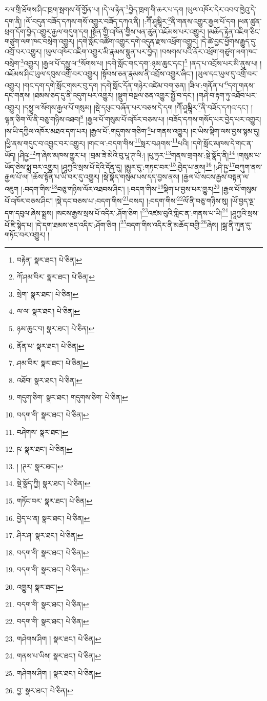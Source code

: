རལ་གྲི་ཐོགས་ཤིང་ཁྲག་སྦགས་གོ་གྱོན་པ། །དེ་ལ་རྟེན་\footnote{བརྟེན་  སྣར་ཐང་།  པེ་ཅིན། }བྱེད་ཁྲག་གི་ཆར་པ་དག །ཡུལ་འཁོར་དེར་འབབ་ཁྱེའུ་དེ་དག་ནི། །ལོ་བདུན་བཟོད་དཀས་གསོ་འགྱུར་བཟོད་དཀའ་ནི། །:ཀཽ་ཤཱམྦཱིར་\footnote{ཀོ་ཤམ་བིར་  སྣར་ཐང་།  པེ་ཅིན། }ནི་གནས་འགྱུར་རྒྱལ་པོ་དག །ཕན་ཚུན་ཕྲག་དོག་བྱེད་འགྱུར་རྒྱལ་གདུག་དག །སྔོན་གྱི་འཁོན་གྱིས་ཕན་ཚུན་འཇོམས་པར་འགྱུར། །མཆོད་རྟེན་འཇིག་ཅིང་གཙུག་ལག་ཁང་བསྲེག་འགྱུར། །དགེ་སློང་འཚོག་འགྱུར་དགེ་འདུན་རྫས་འཕྲོག་འགྱུར། །དེ་ཚེ་བྱང་ཕྱོགས་རྒྱུད་དུ་འགྲོ་བར་འགྱུར། །ཡུལ་འཁོར་འཇིག་འགྱུར་མི་རྣམས་སྣུན་པར་བྱེད། །བསགས་པའི་ནོར་འཕྲོག་གཙུག་ལག་ཁང་བསྲེག་\footnote{སྲེག་  སྣར་ཐང་།  པེ་ཅིན། }འགྱུར། །རྒྱལ་པོ་དསྱུ་ལ་\footnote{ལ་ལ་  སྣར་ཐང་།  པེ་ཅིན། }སོགས་པ། །དགེ་སློང་གང་དག་:ཉམ་ཆུང་དང་།\footnote{ཉམ་ཆུང་བ།  སྣར་ཐང་།  པེ་ཅིན། } །ནད་པ་འབྲོས་པར་མི་ནུས་པ། །འཇོམས་ཤིང་ཡུལ་དབུས་འགྲོ་བར་འགྱུར། །སྟོབས་ཅན་རྣམས་ནི་འབྲོས་འགྱུར་ཞིང་། །ཡུལ་དང་ཡུལ་དུ་འགྲོ་བར་འགྱུར། །གང་དག་དགེ་སློང་གསར་བུ་དག །དགེ་སློང་དོན་གཉེར་འཛེམ་བག་ཅན། །ཟིལ་:གནོན་པ་\footnote{ནོན་པ་  སྣར་ཐང་།  པེ་ཅིན། }དག་གནས་དང་གནས། །ཐམས་ཅད་དུ་ནི་འདུག་པར་འགྱུར། །སྡུག་བསྔལ་ཅན་འགྱུར་སྤྱོ་བ་དང་། །གཤེ་བ་རྟག་ཏུ་འཐོབ་པར་འགྱུར། །དསྱུ་ལ་སོགས་རྒྱལ་པོ་གསུམ། །སྡེ་དཔུང་བཞོན་པར་བཅས་དེ་དག །ཀཽ་ཤཱམྦཱིར་\footnote{ཤམ་བིར་  སྣར་ཐང་།  པེ་ཅིན། }ནི་བཟོད་དཀའ་དང་། །ལྷན་ཅིག་ལོ་ནི་བཅུ་གཉིས་འཐབ།\footnote{འཐོབ།  སྣར་ཐང་།  པེ་ཅིན། } །རྒྱལ་པོ་གསུམ་པོ་འཁོར་བཅས་པ། །བཟོད་དཀས་གསོད་པར་བྱེད་པར་འགྱུར། །ས་ཡི་དཀྱིལ་འཁོར་མཐའ་དག་པར། །རྒྱལ་པོ་:གདུགས་གཅིག་\footnote{གདུག་ཅིག་  སྣར་ཐང་། གདུགས་ཅིག་  པེ་ཅིན། }པ་གནས་འགྱུར། །ང་ཡིས་སྡིག་ལས་བྱས་སྙམ་དུ། །ཕྱི་ནས་གདུང་བ་འབྱུང་བར་འགྱུར། །གང་ལ་:བདག་གིས་\footnote{བདག་གི་  སྣར་ཐང་།  པེ་ཅིན། }སླར་བཤགས་\footnote{བཤེགས་  སྣར་ཐང་། }པའི། །དགེ་སློང་མཁས་དེ་གང་ན་ཡོད། །ཤིཥྱ་\footnote{ཥ་  སྣར་ཐང་།  པེ་ཅིན། }ཀ་ཞེས་མཁས་གྱུར་པ། །བྲམ་ཟེ་མེའི་བུ་པཱ་ཊ་ལི:། །པུ་ཏྲར་\footnote{། །ཊར་  སྣར་ཐང་། }གནས་གྲགས་:སྡེ་སྣོད་ནི།\footnote{སྡེ་སྣོད་ཀྱི།  སྣར་ཐང་།  པེ་ཅིན། } །གསུམ་པ་ཡོད་ཅེས་སྨྲ་བར་འགྱུར། །ཤཱཀྱའི་སྲས་པོ་དེའི་དོན་དུ། །མྱུར་དུ་:གཏང་བར་\footnote{གཏོང་བར་  སྣར་ཐང་།  པེ་ཅིན། }:བྱེད་པ་ནས།\footnote{བྱེད་པ་ན།  སྣར་ཐང་།  པེ་ཅིན། } །:ཤི་ཥྱ་\footnote{ཤིར་ཤ་  སྣར་ཐང་།  པེ་ཅིན། }བཀུག་ནས་རྒྱལ་པོ་ལ། །ཆོས་སྟོན་པ་ཡི་བར་དུ་འགྱུར། །སྡེ་སྣོད་གསུམ་པས་དད་བྱས་ནས། །རྒྱལ་པོ་སངས་རྒྱས་བསྟན་ལ་འཇུག །:བདག་གིས་\footnote{བདག་གི་  སྣར་ཐང་།  པེ་ཅིན། }བཅུ་གཉིས་ལོར་འཐབས་ཤིང་། །:བདག་གིས་\footnote{བདག་གི་  སྣར་ཐང་།  པེ་ཅིན། }སྡིག་པ་བྱས་པར་གྱུར།\footnote{འགྱུར།  སྣར་ཐང་། } །རྒྱལ་པོ་གསུམ་པོ་འཁོར་བཅས་ཤིང་། །སྡེ་དང་བཅས་པ་:བདག་གིས་\footnote{བདག་གི་  སྣར་ཐང་།  པེ་ཅིན། }བསད། །:བདག་གིས་\footnote{བདག་གི་  སྣར་ཐང་།  པེ་ཅིན། }ལོ་ནི་བཅུ་གཉིས་སུ། །ཡོ་བྱད་ལྔ་དག་དབུལ་ཞེས་སྨྲས། །སངས་རྒྱས་སྲས་པོ་འདིར་:ཤོག་ཅིག །\footnote{གཤེགས་ཤིག །  སྣར་ཐང་།  པེ་ཅིན། }འཛམ་བུའི་གླིང་ན་:གནས་པ་ཡི།\footnote{གནས་པ་ཡིས།  སྣར་ཐང་།  པེ་ཅིན། } །ཤཱཀྱའི་སྲས་པོ་ཇི་སྙེད་པ། །དེ་དག་ཐམས་ཅད་འདིར་:ཤོག་ཅིག །\footnote{གཤེགས་ཤིག །  སྣར་ཐང་།  པེ་ཅིན། }བདག་གིས་འདིར་ནི་མཆོད་བགྱི་\footnote{བྱ་  སྣར་ཐང་།  པེ་ཅིན། }ཞེས། །སྒྲ་ནི་ཀུན་དུ་གཏོང་བར་འགྱུར། །
